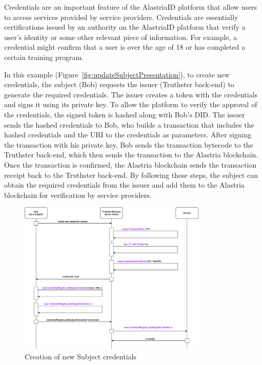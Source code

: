 \documentclass[target=mst,aauheader=]{thud}
\begin{document}
Credentials are an important feature of the AlastriaID platform that allow users to access services provided by service providers. Credentials are essentially certifications issued by an authority on the AlastriaID platform that verify a user's identity or some other relevant piece of information. For example, a credential might confirm that a user is over the age of 18 or has completed a certain training program.\par
In this example (Figure~\ref{fig:updateSubjectPresentation}), to create new credentials, the subject (Bob) requests the issuer (Truthster back-end) to generate the required credentials. The issuer creates a token with the credentials and signs it using its private key. To allow the platform to verify the approval of the credentials, the signed token is hashed along with Bob's DID. The issuer sends the hashed credentials to Bob, who builds a transaction that includes the hashed credentials and the URI to the credentials as parameters. After signing the transaction with his private key, Bob sends the transaction bytecode to the Truthster back-end, which then sends the transaction to the Alastria blockchain. Once the transaction is confirmed, the Alastria blockchain sends the transaction receipt back to the Truthster back-end. By following these steps, the subject can obtain the required credentials from the issuer and add them to the Alastria blockchain for verification by service providers.

\begin{figure}
    \centering
    \includegraphics[width=0.8\textwidth]{images/createSubjectCredentials.png}
    \caption{Creation of new Subject credentials}
    \label{fig:createSubjectCredentials}
\end{figure}
\end{document}
